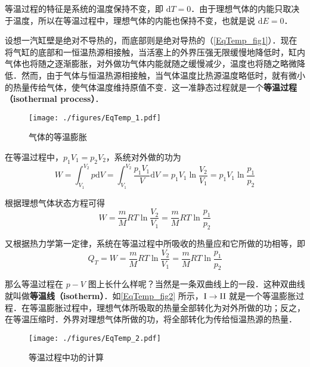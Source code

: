 

等温过程的特征是系统的温度保持不变，即 $\mathrm dT=0$．由于理想气体的内能只取决于温度，所以在等温过程中，理想气体的内能也保持不变，也就是说 $\mathrm dE=0$．

设想一汽缸壁是绝对不导热的，而底部则是绝对导热的（\autoref{EqTemp_fig1}）．现在将气缸的底部和一恒温热源相接触，当活塞上的外界压强无限缓慢地降低时，缸内气体也将随之逐渐膨胀，对外做功气体内能就随之缓慢减少，温度也将随之略微降低．然而，由于气体与恒温热源相接触，当气体温度比热源温度略低时，就有微小的热量传给气体，使气体温度维持原值不变．这一准静态过程就是一个\textbf{等温过程（isothermal process）}．
\begin{figure}[ht]
\centering
\texttt{[image: ./figures/EqTemp\_1.pdf]}
\caption{气体的等温膨胀} \label{EqTemp_fig1}
\end{figure}

在等温过程中，$p_1V_1=p_2V_2$，系统对外做的功为
\begin{equation}
W= \int_{V_{1}}^{V_{2}} p \mathrm{d} V=\int_{V_{1}}^{V_{2}} \frac{p_{1} V_{1}}{V} \mathrm{d} V=p_{1} V_{1} \ln \frac{V_{2}}{V_{1}}=p_{1} V_{1} \ln \frac{p_{1}}{p_{2}}
\end{equation}

根据理想气体状态方程可得
\begin{equation}
W=\frac{m}{M} R T \ln \frac{V_{2}}{V_{1}}=\frac{m}{M} R T \ln \frac{p_{1}}{p_{2}}
\end{equation}

又根据热力学第一定律，系统在等温过程中所吸收的热量应和它所做的功相等，即
\begin{equation}
Q_{T}=W=\frac{m}{M} R T \ln \frac{V_{2}}{V_{1}}=\frac{m}{M} R T \ln \frac{p_{1}}{p_{2}}
\end{equation}

那么等温过程在 $p-V$ 图上长什么样呢？当然是一条双曲线上的一段．这种双曲线就叫做\textbf{等温线（isotherm）}．如\autoref{EqTemp_fig2} 所示，$\rm I\to II$ 就是一个等温膨胀过程．在等温膨胀过程中，理想气体所吸取的热量全部转化为对外所做的功；反之，在等温压缩时．外界对理想气体所做的功，将全部转化为传给恒温热源的热量．

\begin{figure}[ht]
\centering
\texttt{[image: ./figures/EqTemp\_2.pdf]}
\caption{等温过程中功的计算} \label{EqTemp_fig2}
\end{figure}

